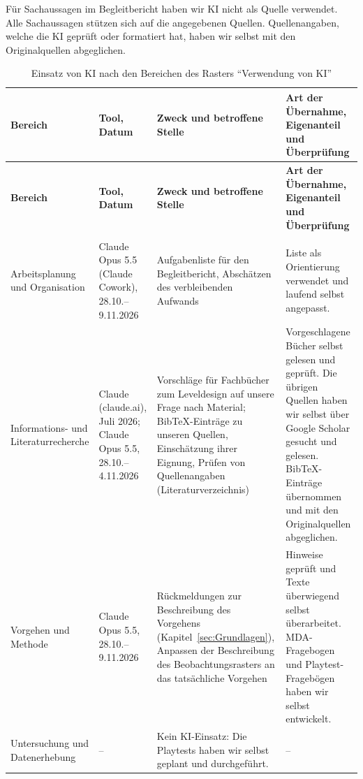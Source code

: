 \documentclass[../Main.tex]{subfiles}
\begin{document}
Für Sachaussagen im Begleitbericht haben wir KI nicht als Quelle verwendet. Alle Sachaussagen stützen sich auf die angegebenen Quellen. Quellenangaben, welche die KI geprüft oder formatiert hat, haben wir selbst mit den Originalquellen abgeglichen.

{\small
    \renewcommand{\arraystretch}{1.3}
    \begin{longtable}{|>{\raggedright\arraybackslash}p{2.3cm}|>{\raggedright\arraybackslash}p{2.4cm}|>{\raggedright\arraybackslash}p{4.4cm}|>{\raggedright\arraybackslash}p{4.6cm}|}
        \hline
        \textbf{Bereich} & \textbf{Tool, Datum} & \textbf{Zweck und betroffene Stelle} & \textbf{Art der Übernahme, Eigenanteil und Überprüfung} \\
        \hline
        \endfirsthead
        \hline
        \textbf{Bereich} & \textbf{Tool, Datum} & \textbf{Zweck und betroffene Stelle} & \textbf{Art der Übernahme, Eigenanteil und Überprüfung} \\
        \hline
        \endhead
        \multicolumn{4}{r}{\textit{Fortsetzung auf der nächsten Seite}} \\
        \endfoot
        \caption{Einsatz von KI nach den Bereichen des Rasters \enquote{Verwendung von KI}}
        \label{tab:KI}
        \endlastfoot
        Arbeitsplanung und Organisation & Claude Opus 5.5 (Claude Cowork), 28.10.--9.11.2026 & Aufgabenliste für den Begleitbericht, Abschätzen des verbleibenden Aufwands & Liste als Orientierung verwendet und laufend selbst angepasst. \\
        \hline
        Informations- und Literaturrecherche & Claude (claude.ai), Juli 2026; Claude Opus 5.5, 28.10.--4.11.2026 & Vorschläge für Fachbücher zum Leveldesign auf unsere Frage nach Material; BibTeX-Einträge zu unseren Quellen, Einschätzung ihrer Eignung, Prüfen von Quellenangaben (Literaturverzeichnis) & Vorgeschlagene Bücher selbst gelesen und geprüft. Die übrigen Quellen haben wir selbst über Google Scholar gesucht und gelesen. BibTeX-Einträge übernommen und mit den Originalquellen abgeglichen. \\
        \hline
        Vorgehen und Methode & Claude Opus 5.5, 28.10.--9.11.2026 & Rückmeldungen zur Beschreibung des Vorgehens (Kapitel~\ref{sec:Grundlagen}), Anpassen der Beschreibung des Beobachtungsrasters an das tatsächliche Vorgehen & Hinweise geprüft und Texte überwiegend selbst überarbeitet. MDA-Fragebogen und Playtest-Fragebögen haben wir selbst entwickelt. \\
        \hline
        Untersuchung und Datenerhebung & -- & Kein KI-Einsatz: Die Playtests haben wir selbst geplant und durchgeführt. & -- \\

\end{longtable}}
\end{document}
